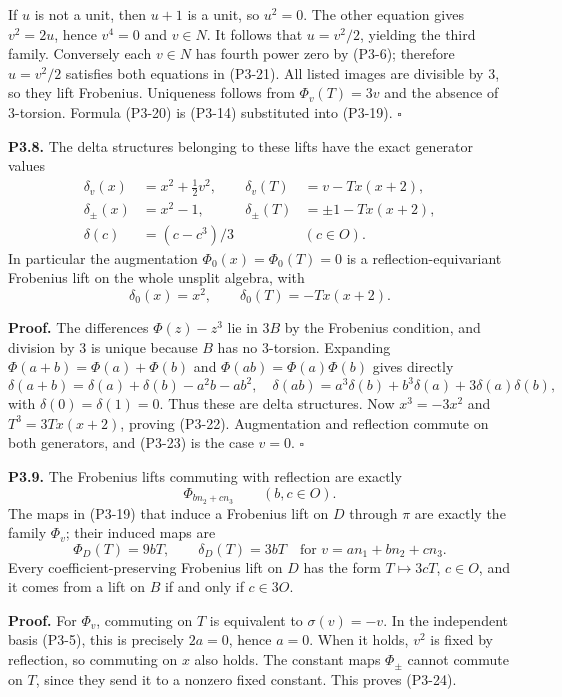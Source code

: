 \documentclass[
]{article}
\begin{document}
If \(u\) is not a unit, then \(u+1\) is a unit, so \(u^2=0\). The other
equation gives \(v^2=2u\), hence \(v^4=0\) and \(v\in N\). It follows
that \(u=v^2/2\), yielding the third family. Conversely each \(v\in N\)
has fourth power zero by (P3-6); therefore \(u=v^2/2\) satisfies both
equations in (P3-21). All listed images are divisible by 3, so they lift
Frobenius. Uniqueness follows from \(\Phi_v(T)=3v\) and the absence of
3-torsion. Formula (P3-20) is (P3-14) substituted into (P3-19).
\(\square\)

\textbf{P3.8.} The delta structures belonging to these lifts have the
exact generator values \[
\begin{aligned}
\delta_v(x)&=x^2+\frac12v^2,&
\delta_v(T)&=v-Tx(x+2),\\
\delta_\pm(x)&=x^2-1,&
\delta_\pm(T)&=\pm1-Tx(x+2),\\
\delta(c)&=(c-c^3)/3&& (c\in O).
\end{aligned}
\tag{P3-22}
\] In particular the augmentation \(\Phi_0(x)=\Phi_0(T)=0\) is a
reflection-equivariant Frobenius lift on the whole unsplit algebra, with
\[
\delta_0(x)=x^2,\qquad \delta_0(T)=-Tx(x+2).
\tag{P3-23}
\]

\textbf{Proof.} The differences \(\Phi(z)-z^3\) lie in \(3B\) by the
Frobenius condition, and division by 3 is unique because \(B\) has no
3-torsion. Expanding \(\Phi(a+b)=\Phi(a)+\Phi(b)\) and
\(\Phi(ab)=\Phi(a)\Phi(b)\) gives directly \[
\delta(a+b)=\delta(a)+\delta(b)-a^2b-ab^2,
\quad
\delta(ab)=a^3\delta(b)+b^3\delta(a)+3\delta(a)\delta(b),
\] with \(\delta(0)=\delta(1)=0\). Thus these are delta structures. Now
\(x^3=-3x^2\) and \(T^3=3Tx(x+2)\), proving (P3-22). Augmentation and
reflection commute on both generators, and (P3-23) is the case \(v=0\).
\(\square\)

\textbf{P3.9.} The Frobenius lifts commuting with reflection are exactly
\[
\Phi_{bn_2+cn_3}\qquad(b,c\in O).
\tag{P3-24}
\] The maps in (P3-19) that induce a Frobenius lift on \(D\) through
\(\pi\) are exactly the family \(\Phi_v\); their induced maps are \[
\Phi_D(T)=9bT,\qquad\delta_D(T)=3bT
\quad\text{for }v=an_1+bn_2+cn_3.
\tag{P3-25}
\] Every coefficient-preserving Frobenius lift on \(D\) has the form
\(T\mapsto3cT\), \(c\in O\), and it comes from a lift on \(B\) if and
only if \(c\in3O\).

\textbf{Proof.} For \(\Phi_v\), commuting on \(T\) is equivalent to
\(\sigma(v)=-v\). In the independent basis (P3-5), this is precisely
\(2a=0\), hence \(a=0\). When it holds, \(v^2\) is fixed by reflection,
so commuting on \(x\) also holds. The constant maps \(\Phi_\pm\) cannot
commute on \(T\), since they send it to a nonzero fixed constant. This
proves (P3-24).
\end{document}
